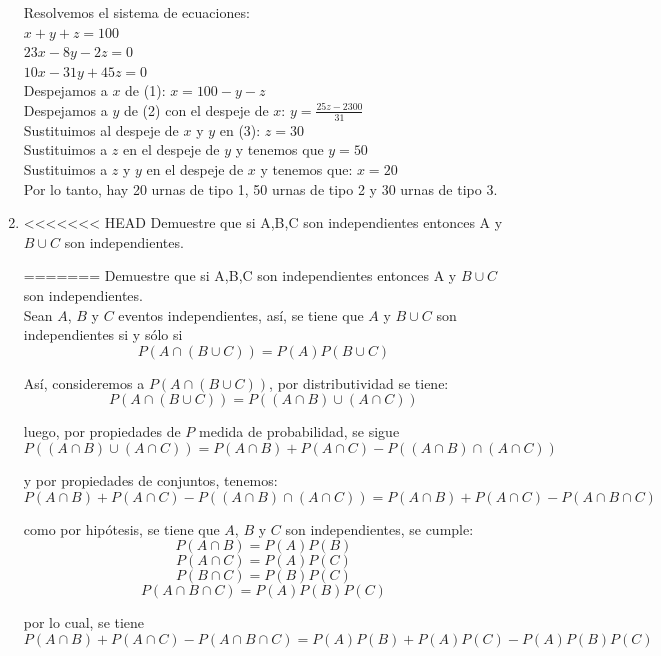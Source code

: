 \documentclass[12pt,a4paper]{report}
\begin{document}
\begin{enumerate}
{Resolvemos el sistema de ecuaciones:\\
$x + y + z = 100$\\
$23x -8y-2z = 0$\\
$10x -31y +45z = 0$\\

Despejamos a $x$ de (1): $ x = 100 -y -z$\\
Despejamos a $y$ de (2) con el despeje de $x$: $ y = \frac{25z -2300}{31}$\\
Sustituimos al despeje de $x$ y $y$ en (3): $z = 30$\\
Sustituimos a $z$ en el despeje de $y$ y tenemos que $y = 50$\\
Sustituimos a $z$ y $y$ en el despeje de $x$ y tenemos que: $x = 20$\\

Por lo tanto, hay 20 urnas de tipo 1, 50 urnas de tipo 2 y 30 urnas de tipo 3.\\

	}

   \item {
<<<<<<< HEAD
   Demuestre que si A,B,C son independientes entonces A y $B\cup C$ son independientes.

    }
=======
   Demuestre que si A,B,C son independientes entonces A y $B\cup C$ son independientes.\\
    Sean $A$, $B$ y  $C$ eventos independientes, así, se tiene que $A$ y $B \cup C$
	son independientes si y sólo si
		$$ P(A\cap(B \cup C)) = P(A)P(B \cup C) $$

	Así, consideremos a $ P(A\cap(B \cup C)) $, por distributividad
	se tiene:
		$$ P(A\cap(B \cup C)) = P((A \cap B) \cup (A \cap C)) $$

	luego, por propiedades de $P$ medida de probabilidad, se sigue
		$$ P((A \cap B) \cup (A \cap C)) = P(A \cap B) + P(A \cap C) - P((A \cap B) \cap (A \cap C)) $$

	y por propiedades de conjuntos, tenemos:
		$$ P(A \cap B) + P(A \cap C) - P((A \cap B) \cap (A \cap C)) = P(A \cap B) + P(A \cap C) - P(A \cap B \cap C) $$

	como por hipótesis, se tiene que $A$, $B$ y $C$ son independientes, se cumple:
		$$ P(A \cap B) = P(A)P(B) $$
		$$ P(A \cap C) = P(A)P(C) $$
		$$ P(B \cap C) = P(B)P(C) $$
		$$ P(A \cap B \cap C) = P(A)P(B)P(C) $$

	por lo cual, se tiene
		$$ P(A \cap B) + P(A \cap C) - P(A \cap B \cap C) = P(A)P(B) + P(A)P(C) - P(A)P(B)P(C) $$


\end{enumerate}
\end{document}
